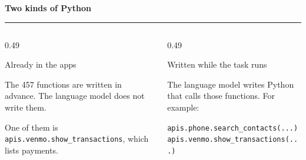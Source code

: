 \documentclass[aspectratio=169,11pt]{beamer}
\begin{document}
\begin{frame}
\begin{center}
  {\Large\bfseries\color{deepblue} Two kinds of Python}\\[2pt]
  {\color{accent}\rule{0.32\linewidth}{1.1pt}}
\end{center}

\vspace{0.55em}
\begin{columns}[T]
\begin{column}{0.49\textwidth}
\begin{stepbox}{Already in the apps}
\raggedright
The 457 functions are written in advance. The language model does not write them.

\vspace{0.4em}
One of them is \texttt{apis.venmo.show\_transactions}, which lists payments.
\end{stepbox}
\end{column}
\begin{column}{0.49\textwidth}
\begin{stepbox}{Written while the task runs}
\raggedright
The language model writes Python that calls those functions. For example:

\vspace{0.45em}
{\scriptsize\texttt{apis.phone.search\_contacts(...)}}\\[2pt]
{\scriptsize\texttt{apis.venmo.show\_transactions(...)}}
\end{stepbox}
\end{column}
\end{columns}
\end{frame}
\end{document}
